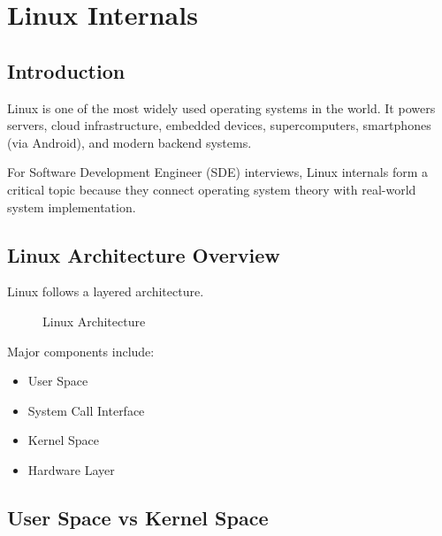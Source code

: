 \chapter{Linux Internals}

\section{Introduction}

Linux is one of the most widely used operating systems in the world. It powers servers, cloud infrastructure, embedded devices, supercomputers, smartphones (via Android), and modern backend systems.

For Software Development Engineer (SDE) interviews, Linux internals form a critical topic because they connect operating system theory with real-world system implementation.

\section{Linux Architecture Overview}

Linux follows a layered architecture.

\begin{figure}[H]
\centering
{}
\caption{Linux Architecture}
\end{figure}

Major components include:

\begin{itemize}
\item User Space
\item System Call Interface
\item Kernel Space
\item Hardware Layer
\end{itemize}

\section{User Space vs Kernel Space}

